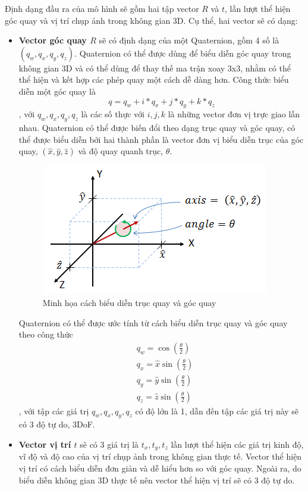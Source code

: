 Định dạng đầu ra của mô hình sẽ gồm hai tập vector $R$ và $t$, lần lượt thể hiện góc quay và vị trí chụp ảnh trong không gian 3D. Cụ thể, hai vector sẽ có dạng:
\begin{itemize}
  \item \textbf{Vector góc quay $R$} sẽ có định dạng của một Quaternion, gồm 4 số là $(q_w, q_x, q_y, q_z)$. Quaternion có thể được dùng để biểu diễn góc quay trong không gian 3D và có thể dùng để thay thế ma trận xoay 3x3, nhằm có thể thể hiện và kết hợp các phép quay một cách dễ dàng hơn. Công thức biểu diễn một góc quay là
        \begin{equation}
          q=q_w + i*q_x + j*q_y + k*q_z
        \end{equation},
        với $q_w, q_x, q_y, q_z$ là các số thực với $i,j,k$ là những vector đơn vị trực giao lẫn nhau. Quaternion có thể được biến đổi theo dạng trục quay và góc quay, có thể được biểu diễn bởi hai thành phần là vector đơn vị biểu diễn trục của góc quay, $(\hat{x},\hat{y},\hat{z})$ và độ quay quanh trục, $\theta$.
        \begin{figure}[H]
          \centering
          \includegraphics[scale=1]{pics/Proposal/axis-angle.png}
          \caption{Minh họa cách biểu diễn trục quay và góc quay \cite{quaternion}}
        \end{figure}
        Quaternion có thể được ước tính từ cách biểu diễn trục quay và góc quay theo công thức
        \begin{equation}
          \begin{aligned}
             & q_w=\cos \left(\frac{\theta}{2}\right)         \\
             & q_x=\hat{x} \sin \left(\frac{\theta}{2}\right) \\
             & q_y=\hat{y} \sin \left(\frac{\theta}{2}\right) \\
             & q_z=\hat{z} \sin \left(\frac{\theta}{2}\right)
          \end{aligned}
        \end{equation},
        với tập các giá trị $q_w, q_x, q_y, q_z$ có độ lớn là 1, dẫn đến tập các giá trị này sẽ có 3 độ tự do, 3DoF.
  \item \textbf{Vector vị trí $t$} sẽ có 3 giá trị là $t_x,t_y,t_z$ lần lượt thể hiện các giá trị kinh độ, vĩ độ và độ cao của vị trí chụp ảnh trong không gian thực tế. Vector thể hiện vị trí có cách biểu diễn đơn giản và dễ hiểu hơn so với góc quay. Ngoài ra, do biểu diễn không gian 3D thực tế nên vector thể hiện vị trí sẽ có 3 độ tự do.
\end{itemize}



